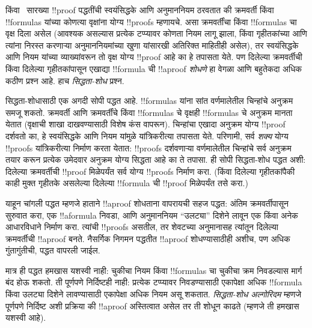 \documentclass[../../../include/open-logic-section]{subfiles}
\begin{document}


 किंवा~ सारख्या !!{proof}
पद्धतींची स्वयंसिद्धके आणि अनुमाननियम ठरवतात की
क्रमवर्ती किंवा !!{formula}s यांच्या कोणत्या वृक्षांना
योग्य !!{proof}s म्हणायचे. असा क्रमवर्तींचा किंवा
!!{formula}s चा वृक्ष दिला असेल (आवश्यक असल्यास
प्रत्येक टप्प्यावर कोणता नियम लागू झाला, किंवा
गृहीतकांच्या आणि त्यांना निरस्त करणाऱ्या अनुमाननियमांच्या
खुणा यांसारखी अतिरिक्त माहितीही असेल), तर
स्वयंसिद्धके आणि नियम यांच्या व्याख्यांवरून तो
वृक्ष योग्य !!{proof} आहे का हे तपासता येते.
पण दिलेल्या क्रमवर्तीची किंवा दिलेल्या गृहीतकांपासून
एखाद्या !!{formula} ची !!a{proof} \emph{शोधणे}
हा वेगळा आणि बहुतेकदा अधिक कठीण प्रश्न आहे.
हाच \emph{सिद्धता-शोध} प्रश्न.

सिद्धता-शोधासाठी एक अगदी सोपी पद्धत आहे.
!!{formula}s यांना सांत वर्णमालेतील चिन्हांचे अनुक्रम
समजू शकतो. क्रमवर्ती आणि क्रमवर्तींचे किंवा
!!{formula}s चे वृक्षही !!{formula}s चे अनुक्रम
मानता येतात (वृक्षाची शाखा दाखवण्यासाठी विशेष
कंस वापरून). चिन्हांचा एखादा अनुक्रम योग्य !!{proof}
दर्शवतो का, हे स्वयंसिद्धके आणि नियम यांमुळे
यांत्रिकरीत्या तपासता येते. परिणामी, सर्व \emph{शक्य}
योग्य !!{proof}s यांत्रिकरीत्या निर्माण करता येतात:
!!{proof}s दर्शवणाऱ्या वर्णमालेतील चिन्हांचे सर्व
अनुक्रम तयार करून प्रत्येक उमेदवार अनुक्रम योग्य
सिद्धता आहे का ते तपासा. ही सोपी सिद्धता-शोध
पद्धत अशी: दिलेल्या क्रमवर्तीची !!{proof} मिळेपर्यंत
सर्व योग्य !!{proof}s निर्माण करा. (किंवा दिलेल्या
गृहीतकांपैकी काही मुक्त गृहीतके असलेल्या दिलेल्या
!!{formula} ची !!{proof} मिळेपर्यंत तसे करा.)

याहून चांगली पद्धत म्हणजे हाताने !!a{proof}
शोधताना वापरायची सहज पद्धत: अंतिम क्रमवर्तीपासून
सुरुवात करा, एक !!a{formula} निवडा, आणि अनुमाननियम
``उलट्या'' दिशेने लावून एक किंवा अनेक आधारविधाने
निर्माण करा. त्यांची !!{proof}s असतील, तर शेवटच्या
अनुमानासह त्यांतून दिलेल्या क्रमवर्तीची !!a{proof}
बनते. नैसर्गिक निगमन पद्धतीत !!a{proof}
शोधण्यासाठीही अशीच, पण अधिक गुंतागुंतीची, पद्धत
वापरली जाईल.

मात्र ही पद्धत हमखास यशस्वी नाही:
चुकीचा नियम किंवा !!{formula}s चा चुकीचा क्रम
निवडल्यास मार्ग बंद होऊ शकतो. ती पूर्णपणे
निर्दिष्टही नाही: प्रत्येक टप्प्यावर निवडण्यासाठी
एकापेक्षा अधिक !!{formula} किंवा उलट्या दिशेने
लावण्यासाठी एकापेक्षा अधिक नियम असू शकतात.
\emph{सिद्धता-शोध अल्गोरिदम} म्हणजे पूर्णपणे
निर्दिष्ट अशी प्रक्रिया की !!a{proof} अस्तित्वात
असेल तर ती शोधून काढते (म्हणजे ती हमखास यशस्वी आहे).
\end{document}
